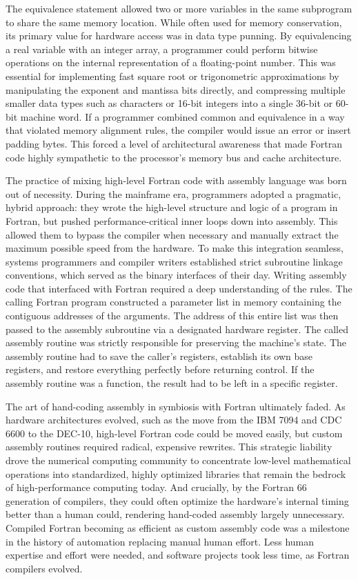 The equivalence statement allowed two or more variables in the same subprogram to share the same memory location. While often used for memory conservation, its primary value for hardware access was in data type punning. By equivalencing a real variable with an integer array, a programmer could perform bitwise operations on the internal representation of a floating-point number. This was essential for implementing fast square root or trigonometric approximations by manipulating the exponent and mantissa bits directly, and compressing multiple smaller data types such as characters or 16-bit integers into a single 36-bit or 60-bit machine word. If a programmer combined common and equivalence in a way that violated memory alignment rules, the compiler would issue an error or insert padding bytes. This forced a level of architectural awareness that made Fortran code highly sympathetic to the processor’s memory bus and cache architecture.

The practice of mixing high-level Fortran code with assembly language was born out of necessity. During the mainframe era, programmers adopted a pragmatic, hybrid approach: they wrote the high-level structure and logic of a program in Fortran, but pushed performance-critical inner loops down into assembly. This allowed them to bypass the compiler when necessary and manually extract the maximum possible speed from the hardware. To make this integration seamless, systems programmers and compiler writers established strict subroutine linkage conventions, which served as the binary interfaces of their day. Writing assembly code that interfaced with Fortran required a deep understanding of the rules. The calling Fortran program constructed a parameter list in memory containing the contiguous addresses of the arguments. The address of this entire list was then passed to the assembly subroutine via a designated hardware register. The called assembly routine was strictly responsible for preserving the machine's state. The assembly routine had to save the caller's registers, establish its own base registers, and restore everything perfectly before returning control. If the assembly routine was a function, the result had to be left in a specific register.

The art of hand-coding assembly in symbiosis with Fortran ultimately faded. As hardware architectures evolved, such as the move from the IBM 7094 and CDC 6600 to the DEC-10, high-level Fortran code could be moved easily, but custom assembly routines required radical, expensive rewrites. This strategic liability drove the numerical computing community to concentrate low-level mathematical operations into standardized, highly optimized libraries that remain the bedrock of high-performance computing today. And crucially, by the Fortran 66 generation of compilers, they could often optimize the hardware's internal timing better than a human could, rendering hand-coded assembly largely unnecessary. Compiled Fortran becoming as efficient as custom assembly code was a milestone in the history of automation replacing manual human effort. Less human expertise and effort were needed, and software projects took less time, as Fortran compilers evolved.

